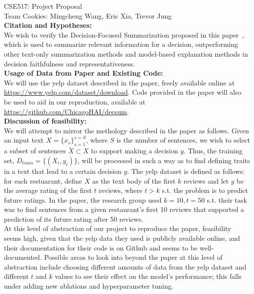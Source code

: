 \documentclass{article}
\begin{document}
    
    CSE517: Project Proposal \\
    Team Cookies: Mingcheng Wang, Eric Xia, Trevor Jung \\

    \textbf{Citation and Hypotheses:} \\

    We wish to verify the Decision-Focused Summarization proposed in this paper~\cite{hsu-tan-2021-decision}, which is used to summarize relevant information for a decision,
    outperforming other text-only summarization methods and model-based explanation methods in decision faithfulness and representativeness. \\

    \textbf{Usage of Data from Paper and Existing Code:} \\
    We will use the yelp dataset described in the paper, freely available online at \href{https://www.yelp.com/dataset/download}{https://www.yelp.com/dataset/download}. Code provided in
    the paper will also be used to aid in our reproduction, available at \href{https://github.com/ChicagoHAI/decsum}{https://github.com/ChicagoHAI/decsum}. \\

    \textbf{Discussion of feasibility:} \\
    We will attempt to mirror the methology described in the paper as follows. Given an input text $X = \{x_s\}_{s=1}^{s=S}$, where $S$ is the number of sentences, we wish to select a
    subset of sentences $\tilde{X}\subset X$
    to support making a decision $y$. Thus, the training set, $D_{train} = \{(X_i, y_i)\}$, will be processed in such a way as to find defining traits in a text that lead to a certain
    decision $y$. The yelp dataset is defined as follows: for each restuarant, define $X$ as the text body of the first $k$ reviews and let $y$ be the average rating of the first $t$
    reviews, where $t > k$ s.t. the problem is to predict future ratings. In the paper, the research group used $k=10, t=50$ s.t. their task was to find sentences from a given
    restaurant's first 10 reviews that supported a prediction of its future rating after 50 reviews. \\

    At this level of abstraction of our project to reproduce the paper, feasibility seems high, given that the yelp data they used is publicly available online, and their documentation
    for their code is on Github and seems to be well-documented. Possible areas to look into beyond the paper at this level of abstraction include
    choosing different amounts of data from the yelp dataset and different $t$ and $k$ values to see their effect on the model's performance; this falls under adding new ablations
    and hyperparameter tuning. \\
\end{document}
